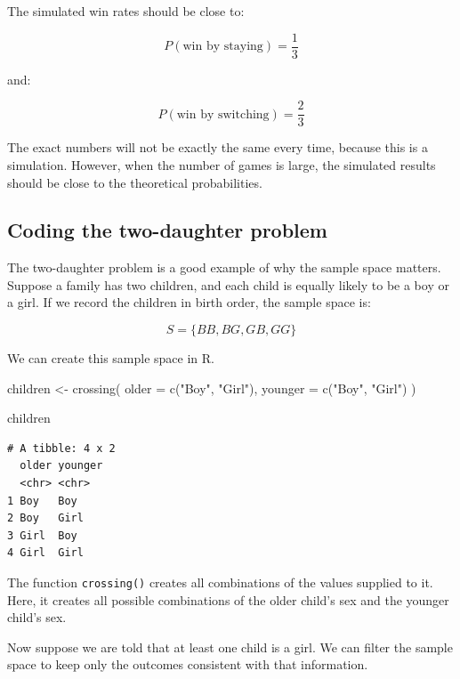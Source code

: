 \documentclass[
  letterpaper,
  DIV=11,
  numbers=noendperiod]{scrreprt}
\newenvironment{Shaded}{\begin{snugshade}}{\end{snugshade}}
\newcommand{\AttributeTok}[1]{\textcolor[rgb]{0.40,0.45,0.13}{#1}}
\newcommand{\FunctionTok}[1]{\textcolor[rgb]{0.28,0.35,0.67}{#1}}
\newcommand{\NormalTok}[1]{\textcolor[rgb]{0.00,0.23,0.31}{#1}}
\newcommand{\OtherTok}[1]{\textcolor[rgb]{0.00,0.23,0.31}{#1}}
\newcommand{\StringTok}[1]{\textcolor[rgb]{0.13,0.47,0.30}{#1}}
\begin{document}
The simulated win rates should be close to:

\[
P(\text{win by staying}) = \frac{1}{3}
\]

and:

\[
P(\text{win by switching}) = \frac{2}{3}
\]

The exact numbers will not be exactly the same every time, because this
is a simulation. However, when the number of games is large, the
simulated results should be close to the theoretical probabilities.

\subsection{Coding the two-daughter
problem}\label{coding-the-two-daughter-problem}

The two-daughter problem is a good example of why the sample space
matters. Suppose a family has two children, and each child is equally
likely to be a boy or a girl. If we record the children in birth order,
the sample space is:

\[
S = \{BB, BG, GB, GG\}
\]

We can create this sample space in R.

\begin{Shaded}
\begin{Highlighting}[]
\NormalTok{children }\OtherTok{\textless{}{-}} \FunctionTok{crossing}\NormalTok{(}
  \AttributeTok{older =} \FunctionTok{c}\NormalTok{(}\StringTok{"Boy"}\NormalTok{, }\StringTok{"Girl"}\NormalTok{),}
  \AttributeTok{younger =} \FunctionTok{c}\NormalTok{(}\StringTok{"Boy"}\NormalTok{, }\StringTok{"Girl"}\NormalTok{)}
\NormalTok{)}

\NormalTok{children}
\end{Highlighting}
\end{Shaded}

\begin{verbatim}
# A tibble: 4 x 2
  older younger
  <chr> <chr>  
1 Boy   Boy    
2 Boy   Girl   
3 Girl  Boy    
4 Girl  Girl   
\end{verbatim}

The function \texttt{crossing()} creates all combinations of the values
supplied to it. Here, it creates all possible combinations of the older
child's sex and the younger child's sex.

Now suppose we are told that at least one child is a girl. We can filter
the sample space to keep only the outcomes consistent with that
information.
\end{document}
